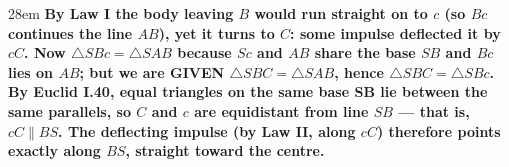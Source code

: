 \documentclass[border=4pt]{standalone}
\begin{document}
\begin{varwidth}{28em}
\large\bfseries
By Law I the body leaving $B$ would run straight on to $c$ (so $Bc$ continues the line $AB$), yet it turns to $C$: some impulse deflected it by $cC$. Now $\triangle SBc=\triangle SAB$ because $Sc$ and $AB$ share the base $SB$ and $Bc$ lies on $AB$; but we are GIVEN $\triangle SBC=\triangle SAB$, hence $\triangle SBC=\triangle SBc$. By Euclid I.40, equal triangles on the same base SB lie between the same parallels, so $C$ and $c$ are equidistant from line $SB$ — that is, $cC \parallel BS$. The deflecting impulse (by Law II, along $cC$) therefore points exactly along $BS$, straight toward the centre.
\end{varwidth}
\end{document}
